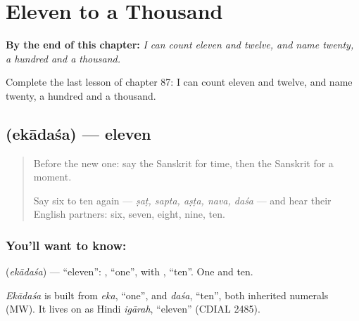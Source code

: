 
\chapter{Eleven to a Thousand}
\label{ch:sa-eleven-to-a-thousand}

\begin{chapteropening}
\textbf{By the end of this chapter:} \emph{I can count eleven and twelve, and name twenty, a hundred and a thousand.}

Complete the last lesson of chapter 87: I can count eleven and twelve, and name twenty, a hundred and a thousand.
\end{chapteropening}

\section[\texorpdfstring{\sk{एकादश} (ekādaśa)}{एकादश (ekādaśa)}]{ (ekādaśa) — eleven}

\label{lesson:SA-C87-eleven}



\begin{quote}
Before the new one: say the Sanskrit for time, then the Sanskrit for a moment.

Say six to ten again — \emph{ṣaṭ, sapta, aṣṭa, nava, daśa} — and hear their English partners: six, seven, eight, nine, ten.
\end{quote}

\subsection*{You'll want to know: }
\textbf{} (\emph{ekādaśa}) — \textquotedblleft{}eleven\textquotedblright{}: \textbf{}, \textquotedblleft{}one\textquotedblright{}, with \textbf{}, \textquotedblleft{}ten\textquotedblright{}. One and ten.

\begin{cousinweb}
\emph{Ekādaśa} is built from \emph{eka}, \textquotedblleft{}one\textquotedblright{}, and \emph{daśa}, \textquotedblleft{}ten\textquotedblright{}, both inherited numerals (MW). It lives on as Hindi \emph{igārah}, \textquotedblleft{}eleven\textquotedblright{} (CDIAL 2485).
\end{cousinweb}

